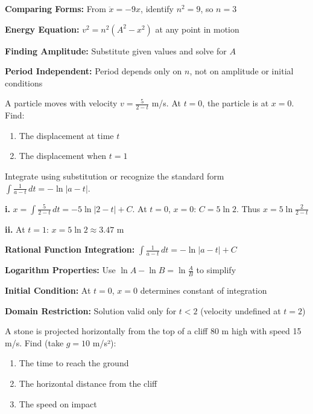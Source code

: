 \begin{takeaways}
\item \textbf{Comparing Forms:} From $\ddot{x} = -9x$, identify $n^2 = 9$, so $n = 3$
\item \textbf{Energy Equation:} $v^2 = n^2(A^2 - x^2)$ at any point in motion
\item \textbf{Finding Amplitude:} Substitute given values and solve for $A$
\item \textbf{Period Independent:} Period depends only on $n$, not on amplitude or initial conditions
\end{takeaways}

\begin{problem}
A particle moves with velocity $v = \frac{5}{2-t}$ m/s. At $t = 0$, the particle is at $x = 0$. Find:
\begin{enumerate}[label=\textbf{\roman*.}]
    \item The displacement at time $t$
    \item The displacement when $t = 1$
\end{enumerate}
\end{problem}

\begin{hint}
Integrate using substitution or recognize the standard form $\int \frac{1}{a-t}\,dt = -\ln|a-t|$.
\end{hint}

\begin{solution}
\textbf{i.} $x = \int \frac{5}{2-t}\,dt = -5\ln|2-t| + C$. At $t=0$, $x=0$: $C = 5\ln 2$. Thus $x = 5\ln\frac{2}{2-t}$

\textbf{ii.} At $t=1$: $x = 5\ln 2 \approx 3.47$ m
\end{solution}

\begin{takeaways}
\item \textbf{Rational Function Integration:} $\int \frac{1}{a-t}\,dt = -\ln|a-t| + C$
\item \textbf{Logarithm Properties:} Use $\ln A - \ln B = \ln\frac{A}{B}$ to simplify
\item \textbf{Initial Condition:} At $t=0$, $x=0$ determines constant of integration
\item \textbf{Domain Restriction:} Solution valid only for $t < 2$ (velocity undefined at $t=2$)
\end{takeaways}

\begin{problem}
A stone is projected horizontally from the top of a cliff 80 m high with speed 15 m/s. Find (take $g = 10$ m/s²):
\begin{enumerate}[label=\textbf{\roman*.}]
    \item The time to reach the ground
    \item The horizontal distance from the cliff
    \item The speed on impact
\end{enumerate}
\end{problem}

